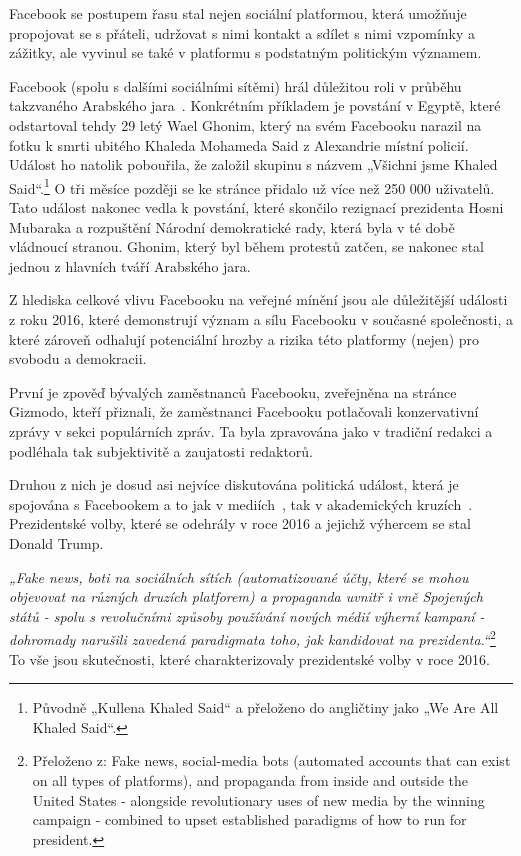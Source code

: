     Facebook se postupem řasu stal nejen sociální platformou, která umožňuje propojovat se s přáteli, udržovat s nimi kontakt a sdílet s nimi vzpomínky a zážitky, ale vyvinul se také v platformu s podstatným politickým významem. 
    
    Facebook (spolu s dalšími sociálními sítěmi) hrál důležitou roli v průběhu takzvaného Arabského jara~\citep{Wolfsfeld_andothers}. Konkrétním příkladem je povstání v Egyptě, které odstartoval tehdy 29 letý Wael Ghonim, který na svém Facebooku narazil na fotku k smrti ubitého Khaleda Mohameda Said z Alexandrie místní policií. Událost ho natolik pobouřila, že založil skupinu s názvem „Všichni jsme Khaled Said“.\footnote{Původně „Kullena Khaled Said“ a přeloženo do angličtiny jako „We Are All Khaled Said“.} O tři měsíce později se ke stránce přidalo už více než 250 000 uživatelů. Tato událost nakonec vedla k povstání, které skončilo rezignací prezidenta Hosni Mubaraka a rozpuštění Národní demokratické rady, která byla v té době vládnoucí stranou. Ghonim, který byl během protestů zatčen, se nakonec stal jednou z hlavních tváří Arabského jara.~\citep{vargas_2012}
    
    Z hlediska celkové vlivu Facebooku na veřejné mínění jsou ale důležitější události z roku 2016, které demonstrují význam a sílu Facebooku v současné společnosti, a které zároveň odhalují potenciální hrozby a rizika této platformy (nejen) pro svobodu a demokracii. ~\citep{andrewgreiner_fiegerman_sherman_baker_2019} 
    
    První je zpověď bývalých zaměstnanců Facebooku, zveřejněna na stránce Gizmodo, kteří přiznali, že zaměstnanci Facebooku potlačovali konzervativní zprávy v sekci populárních zpráv. Ta byla zpravována jako v tradiční redakci a podléhala tak subjektivitě a zaujatosti redaktorů.~\citep{nunez_2016} 
    
    Druhou z nich je dosud asi nejvíce diskutována politická událost, která je spojována s Facebookem a to jak v mediích~\citep{lapowsky_2017, madrigal_2017, olson_2016, solon_2016}, tak v akademických kruzích~\citep{Bossetta, Davies, Groshek, Krafft2017, ziegler2018international}. Prezidentské volby, které se odehrály v roce 2016 a jejichž výhercem se stal Donald Trump.~\citep{roberts_siddiqui_jacobs_gambino_holpuch_2016} 
    
    
    \setlength\parskip{5mm}
    
    \textit{„Fake news, boti na sociálních sítích (automatizované účty, které se mohou objevovat na různých druzích platforem) a propaganda uvnitř i vně Spojených států - spolu s revolučními způsoby používání nových médií výherní kampaní - dohromady narušili zavedená paradigmata toho, jak kandidovat na prezidenta.“}\footnote{Přeloženo z: Fake news, social-media bots (automated accounts that can exist on all types of platforms), and propaganda from inside and outside the United States -  alongside revolutionary uses of new media by the winning campaign - combined to upset established paradigms of how to run for president.}~\citep{persily20172016} To vše jsou skutečnosti, které charakterizovaly prezidentské volby v roce 2016. 
    
